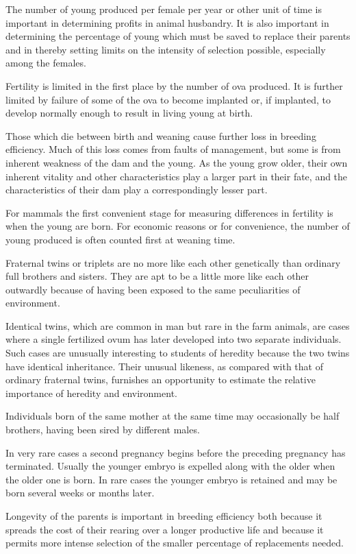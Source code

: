 The number of young produced per female per year or other unit of
time is important in determining profits in animal husbandry. It is also
important in determining the percentage of young which must be saved
to replace their parents and in thereby setting limits on the intensity of
selection possible, especially among the females.

Fertility is limited in the first place by the number of ova produced.
It is further limited by failure of some of the ova to become implanted
or, if implanted, to develop normally enough to result in living young
at birth.

Those which die between birth and weaning cause further loss in
breeding efficiency. Much of this loss comes from faults of management,
but some is from inherent weakness of the dam and the young. As the
young grow older, their own inherent vitality and other characteristics
play a larger part in their fate, and the characteristics of their dam play
a correspondingly lesser part.

For mammals the first convenient stage for measuring differences in
fertility is when the young are born. For economic reasons or for convenience,
the number of young produced is often counted first at weaning
time.

Fraternal twins or triplets are no more like each other genetically
than ordinary full brothers and sisters. They are apt to be a little more
like each other outwardly because of having been exposed to the same
peculiarities of environment.

Identical twins, which are common in man but rare in the farm animals,
are cases where a single fertilized ovum has later developed into
two separate individuals. Such cases are unusually interesting to students
of heredity because the two twins have identical inheritance.
Their unusual likeness, as compared with that of ordinary fraternal
twins, furnishes an opportunity to estimate the relative importance of
heredity and environment.

Individuals born of the same mother at the same time may occasionally
be half brothers, having been sired by different males.

In very rare cases a second pregnancy begins before the preceding
pregnancy has terminated. Usually the younger embryo is expelled
along with the older when the older one is born. In rare cases the
younger embryo is retained and may be born several weeks or months
later.

Longevity of the parents is important in breeding efficiency both
because it spreads the cost of their rearing over a longer productive life
and because it permits more intense selection of the smaller percentage
of replacements needed.

